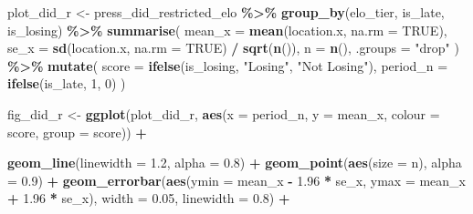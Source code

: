 \documentclass[
]{article}
\newenvironment{Shaded}{\begin{snugshade}}{\end{snugshade}}
\newcommand{\AttributeTok}[1]{\textcolor[rgb]{0.13,0.29,0.53}{#1}}
\newcommand{\ConstantTok}[1]{\textcolor[rgb]{0.56,0.35,0.01}{#1}}
\newcommand{\DecValTok}[1]{\textcolor[rgb]{0.00,0.00,0.81}{#1}}
\newcommand{\FloatTok}[1]{\textcolor[rgb]{0.00,0.00,0.81}{#1}}
\newcommand{\FunctionTok}[1]{\textcolor[rgb]{0.13,0.29,0.53}{\textbf{#1}}}
\newcommand{\NormalTok}[1]{#1}
\newcommand{\OtherTok}[1]{\textcolor[rgb]{0.56,0.35,0.01}{#1}}
\newcommand{\SpecialCharTok}[1]{\textcolor[rgb]{0.81,0.36,0.00}{\textbf{#1}}}
\newcommand{\StringTok}[1]{\textcolor[rgb]{0.31,0.60,0.02}{#1}}
\begin{document}
\begin{Shaded}
\begin{Highlighting}[]
\NormalTok{plot\_did\_r }\OtherTok{\textless{}{-}}\NormalTok{ press\_did\_restricted\_elo }\SpecialCharTok{\%\textgreater{}\%}
  \FunctionTok{group\_by}\NormalTok{(elo\_tier, is\_late, is\_losing) }\SpecialCharTok{\%\textgreater{}\%}
  \FunctionTok{summarise}\NormalTok{(}
    \AttributeTok{mean\_x =} \FunctionTok{mean}\NormalTok{(location.x, }\AttributeTok{na.rm =} \ConstantTok{TRUE}\NormalTok{),}
    \AttributeTok{se\_x   =} \FunctionTok{sd}\NormalTok{(location.x,   }\AttributeTok{na.rm =} \ConstantTok{TRUE}\NormalTok{) }\SpecialCharTok{/} \FunctionTok{sqrt}\NormalTok{(}\FunctionTok{n}\NormalTok{()),}
    \AttributeTok{n      =} \FunctionTok{n}\NormalTok{(), }\AttributeTok{.groups =} \StringTok{"drop"}
\NormalTok{  ) }\SpecialCharTok{\%\textgreater{}\%}
  \FunctionTok{mutate}\NormalTok{(}
    \AttributeTok{score    =} \FunctionTok{ifelse}\NormalTok{(is\_losing, }\StringTok{"Losing"}\NormalTok{, }\StringTok{"Not Losing"}\NormalTok{),}
    \AttributeTok{period\_n =} \FunctionTok{ifelse}\NormalTok{(is\_late, }\DecValTok{1}\NormalTok{, }\DecValTok{0}\NormalTok{)}
\NormalTok{  )}

\NormalTok{fig\_did\_r }\OtherTok{\textless{}{-}} \FunctionTok{ggplot}\NormalTok{(plot\_did\_r,}
       \FunctionTok{aes}\NormalTok{(}\AttributeTok{x =}\NormalTok{ period\_n, }\AttributeTok{y =}\NormalTok{ mean\_x,}
           \AttributeTok{colour =}\NormalTok{ score, }\AttributeTok{group =}\NormalTok{ score)) }\SpecialCharTok{+}

  \FunctionTok{geom\_line}\NormalTok{(}\AttributeTok{linewidth =} \FloatTok{1.2}\NormalTok{, }\AttributeTok{alpha =} \FloatTok{0.8}\NormalTok{) }\SpecialCharTok{+}
  \FunctionTok{geom\_point}\NormalTok{(}\FunctionTok{aes}\NormalTok{(}\AttributeTok{size =}\NormalTok{ n), }\AttributeTok{alpha =} \FloatTok{0.9}\NormalTok{) }\SpecialCharTok{+}
  \FunctionTok{geom\_errorbar}\NormalTok{(}\FunctionTok{aes}\NormalTok{(}\AttributeTok{ymin =}\NormalTok{ mean\_x }\SpecialCharTok{{-}} \FloatTok{1.96} \SpecialCharTok{*}\NormalTok{ se\_x,}
                    \AttributeTok{ymax =}\NormalTok{ mean\_x }\SpecialCharTok{+} \FloatTok{1.96} \SpecialCharTok{*}\NormalTok{ se\_x),}
                \AttributeTok{width =} \FloatTok{0.05}\NormalTok{, }\AttributeTok{linewidth =} \FloatTok{0.8}\NormalTok{) }\SpecialCharTok{+}


\end{Highlighting}
\end{Shaded}
\end{document}
